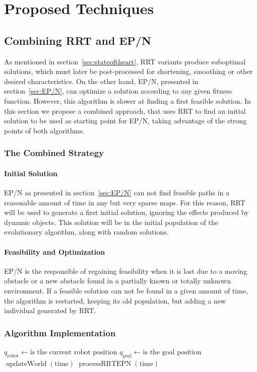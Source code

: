 \chapter{Proposed Techniques}

\section{Combining RRT and EP/N}
\label{sec:RRT-EP/N}
As mentioned in section~\ref{sec:stateoftheart}, RRT variants produce
suboptimal solutions, which must later be post-processed for shortening,
smoothing or other desired characteristics. On the other hand, EP/N, 
presented in section~\ref{sec:EP/N}, can optimize a solution according to any
given fitness function. However, this algorithm is slower at finding a first 
feasible solution. In this section we propose a combined approach, that uses
RRT to find an initial solution to be used as starting point for EP/N,
taking advantage of the strong points of both algorithms.

\subsection{The Combined Strategy}

\subsubsection{Initial Solution}
EP/N as presented in section~\ref{sec:EP/N} can not find feasible paths in a
reasonable amount of time in any but very sparse maps. For this reason, RRT
will be used to generate a first initial solution, ignoring the effects produced
by dynamic objects. This solution will be in the initial population of the
evolutionary algorithm, along with random solutions.

\subsubsection{Feasibility and Optimization}
EP/N is the responsible of regaining feasibility when it is lost due to a
moving obstacle or a new obstacle found in a partially known or totally unknown
environment. If a feasible solution can not be found in a given amount of time,
the algorithm is restarted, keeping its old population, but adding a new
individual
generated by RRT.

\subsection{Algorithm Implementation}
\begin{algorithm}[ht]
    \caption{$\operatorname{Main}()$}
    \label{alg:rrtepn}
    \begin{algorithmic}[1]
        \STATE \(q_{\text{robot}} \leftarrow \text{is the current robot position}\)
        \STATE \(q_{\text{goal}} \leftarrow \text{is the goal position}\)
             \STATE \(\operatorname{updateWorld}(\text{time})\)
             \STATE \(\operatorname{processRRTEPN}(\text{time})\)
        \ENDWHILE
    \end{algorithmic}
\end{algorithm}

